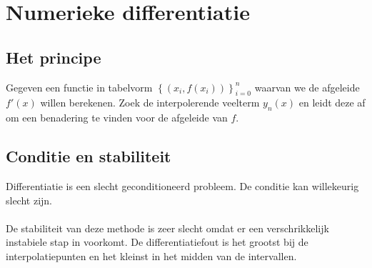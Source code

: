 \documentclass[samenvatting.tex]{subfiles}
\begin{document}
\chapter{Numerieke differentiatie}
\section{Het principe}
Gegeven een functie in tabelvorm $\left\{ (x_i,f(x_i))\right\}_{i=0}^{n}$ waarvan we de afgeleide $f'(x)$ willen berekenen. Zoek de interpolerende veelterm $y_n(x)$ en leidt deze af om een benadering te vinden voor de afgeleide van $f$.

\section{Conditie en stabiliteit}
Differentiatie is een slecht geconditioneerd probleem. De conditie kan willekeurig slecht zijn.\\\\
De stabiliteit van deze methode is zeer slecht omdat er een verschrikkelijk instabiele stap in voorkomt.
De differentiatiefout is het grootst bij de interpolatiepunten en het kleinst in het midden van de intervallen.
\end{document}
